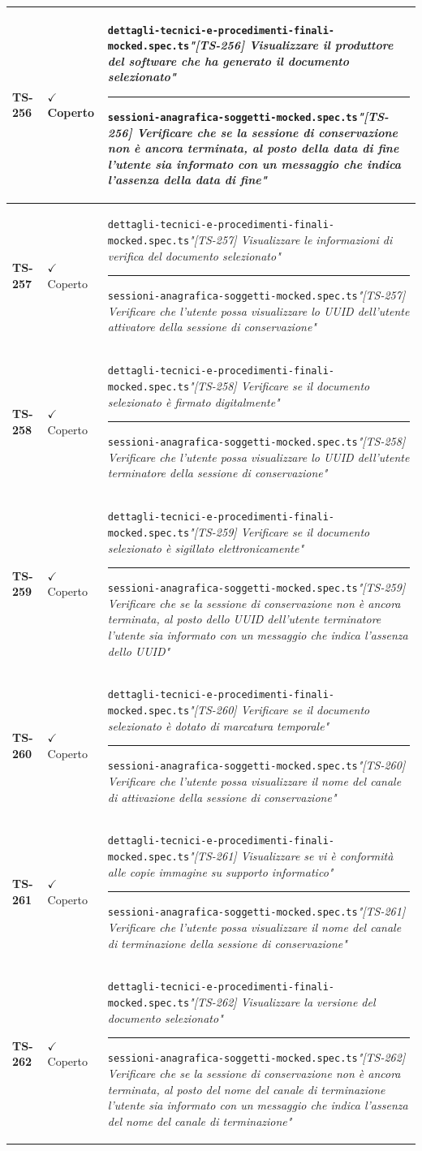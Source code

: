 \documentclass[a4paper,12pt]{article}
\newcommand{\ok}{\textcolor{green!60!black}{$\checkmark$ Coperto}}
\newcommand{\f}[1]{\nolinkurl{#1}\newline}
\newcommand{\q}[1]{\textit{#1}}
\newcommand{\sep}{\newline \vspace{2mm} \hrule \vspace{2mm}}
\begin{document}
\begin{longtable}{|p{1.5cm}|p{3.0cm}|p{10.5cm}|}
\textbf{TS-256} & \ok & \f{dettagli-tecnici-e-procedimenti-finali-mocked.spec.ts}\q{"[TS-256] Visualizzare il produttore del software che ha generato il documento selezionato"} \sep \f{sessioni-anagrafica-soggetti-mocked.spec.ts}\q{"[TS-256] Verificare che se la sessione di conservazione non è ancora terminata, al posto della data di fine l'utente sia informato con un messaggio che indica l'assenza della data di fine"} \\ \hline
\textbf{TS-257} & \ok & \f{dettagli-tecnici-e-procedimenti-finali-mocked.spec.ts}\q{"[TS-257] Visualizzare le informazioni di verifica del documento selezionato"} \sep \f{sessioni-anagrafica-soggetti-mocked.spec.ts}\q{"[TS-257] Verificare che l'utente possa visualizzare lo UUID dell'utente attivatore della sessione di conservazione"} \\ \hline
\textbf{TS-258} & \ok & \f{dettagli-tecnici-e-procedimenti-finali-mocked.spec.ts}\q{"[TS-258] Verificare se il documento selezionato è firmato digitalmente"} \sep \f{sessioni-anagrafica-soggetti-mocked.spec.ts}\q{"[TS-258] Verificare che l'utente possa visualizzare lo UUID dell'utente terminatore della sessione di conservazione"} \\ \hline
\textbf{TS-259} & \ok & \f{dettagli-tecnici-e-procedimenti-finali-mocked.spec.ts}\q{"[TS-259] Verificare se il documento selezionato è sigillato elettronicamente"} \sep \f{sessioni-anagrafica-soggetti-mocked.spec.ts}\q{"[TS-259] Verificare che se la sessione di conservazione non è ancora terminata, al posto dello UUID dell'utente terminatore l'utente sia informato con un messaggio che indica l'assenza dello UUID"} \\ \hline
\textbf{TS-260} & \ok & \f{dettagli-tecnici-e-procedimenti-finali-mocked.spec.ts}\q{"[TS-260] Verificare se il documento selezionato è dotato di marcatura temporale"} \sep \f{sessioni-anagrafica-soggetti-mocked.spec.ts}\q{"[TS-260] Verificare che l'utente possa visualizzare il nome del canale di attivazione della sessione di conservazione"} \\ \hline
\textbf{TS-261} & \ok & \f{dettagli-tecnici-e-procedimenti-finali-mocked.spec.ts}\q{"[TS-261] Visualizzare se vi è conformità alle copie immagine su supporto informatico"} \sep \f{sessioni-anagrafica-soggetti-mocked.spec.ts}\q{"[TS-261] Verificare che l'utente possa visualizzare il nome del canale di terminazione della sessione di conservazione"} \\ \hline
\textbf{TS-262} & \ok & \f{dettagli-tecnici-e-procedimenti-finali-mocked.spec.ts}\q{"[TS-262] Visualizzare la versione del documento selezionato"} \sep \f{sessioni-anagrafica-soggetti-mocked.spec.ts}\q{"[TS-262] Verificare che se la sessione di conservazione non è ancora terminata, al posto del nome del canale di terminazione l'utente sia informato con un messaggio che indica l'assenza del nome del canale di terminazione"} \\ \hline

\end{longtable}
\end{document}
